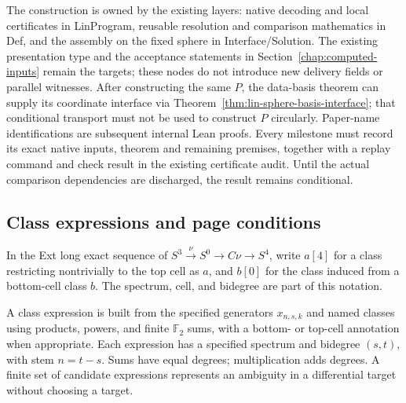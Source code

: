 The construction is owned by the existing layers: native decoding and local
certificates in LinProgram, reusable resolution and comparison mathematics
in Def, and the assembly on the fixed sphere in Interface/Solution.
The existing presentation type and the acceptance statements in
Section~\ref{chap:computed-inputs} remain the targets; these nodes do not
introduce new delivery fields or parallel witnesses. After constructing the
same $P$, the data-basis theorem can supply its coordinate interface via
Theorem~\ref{thm:lin-sphere-basis-interface}; that conditional transport must
not be used to construct $P$ circularly. Paper-name identifications are
subsequent internal Lean proofs. Every milestone must record its exact
native inputs, theorem and remaining premises, together with a replay command
and check result in the existing certificate audit. Until the actual
comparison dependencies are discharged, the result remains conditional.

\subsection{Class expressions and page conditions}

\begin{definition}
  \label{def:hopf-cofiber-cell-notation}
  \notready
  In the Ext long exact sequence of
  $S^3\xrightarrow{\nu}S^0\to C\nu\to S^4$, write $a[4]$ for a
  class restricting nontrivially to the top cell as $a$, and $b[0]$
  for the class induced from a bottom-cell class $b$. The spectrum,
  cell, and bidegree are part of this notation.
\end{definition}

\begin{definition}
  \label{def:typed-class-expression}
  \notready
  A class expression is built from the specified generators $x_{n,s,k}$
  and named classes using products, powers, and finite $\mathbb F_2$
  sums, with a bottom- or top-cell annotation when appropriate.
  Each expression has a specified spectrum and bidegree
  $(s,t)$, with stem $n=t-s$. Sums have equal degrees; multiplication
  adds degrees. A finite set of candidate expressions represents an
  ambiguity in a differential target without choosing a target.
\end{definition}

